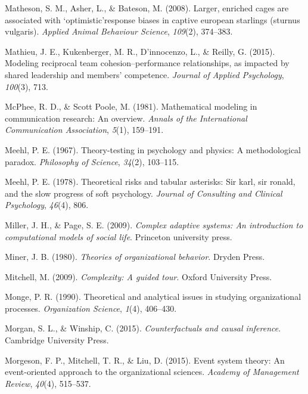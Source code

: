 \documentclass[english,,man]{apa6}
\theoremstyle{definition}
\theoremstyle{definition}
\theoremstyle{definition}
\theoremstyle{remark}
\begin{document}
\leavevmode\hypertarget{ref-matheson2008}{}%
Matheson, S. M., Asher, L., \& Bateson, M. (2008). Larger, enriched
cages are associated with `optimistic'response biases in captive
european starlings (sturnus vulgaris). \emph{Applied Animal Behaviour
Science}, \emph{109}(2), 374--383.

\leavevmode\hypertarget{ref-mathieu2015}{}%
Mathieu, J. E., Kukenberger, M. R., D'innocenzo, L., \& Reilly, G.
(2015). Modeling reciprocal team cohesion--performance relationships, as
impacted by shared leadership and members' competence. \emph{Journal of
Applied Psychology}, \emph{100}(3), 713.

\leavevmode\hypertarget{ref-mcphee1981}{}%
McPhee, R. D., \& Scott Poole, M. (1981). Mathematical modeling in
communication research: An overview. \emph{Annals of the International
Communication Association}, \emph{5}(1), 159--191.

\leavevmode\hypertarget{ref-meehl1967}{}%
Meehl, P. E. (1967). Theory-testing in psychology and physics: A
methodological paradox. \emph{Philosophy of Science}, \emph{34}(2),
103--115.

\leavevmode\hypertarget{ref-meehl1978}{}%
Meehl, P. E. (1978). Theoretical risks and tabular asterisks: Sir karl,
sir ronald, and the slow progress of soft psychology. \emph{Journal of
Consulting and Clinical Psychology}, \emph{46}(4), 806.

\leavevmode\hypertarget{ref-miller2009}{}%
Miller, J. H., \& Page, S. E. (2009). \emph{Complex adaptive systems: An
introduction to computational models of social life}. Princeton
university press.

\leavevmode\hypertarget{ref-miner1980}{}%
Miner, J. B. (1980). \emph{Theories of organizational behavior}. Dryden
Press.

\leavevmode\hypertarget{ref-mitchell2009}{}%
Mitchell, M. (2009). \emph{Complexity: A guided tour}. Oxford University
Press.

\leavevmode\hypertarget{ref-monge1990}{}%
Monge, P. R. (1990). Theoretical and analytical issues in studying
organizational processes. \emph{Organization Science}, \emph{1}(4),
406--430.

\leavevmode\hypertarget{ref-morgan2015}{}%
Morgan, S. L., \& Winship, C. (2015). \emph{Counterfactuals and causal
inference}. Cambridge University Press.

\leavevmode\hypertarget{ref-morgeson2015}{}%
Morgeson, F. P., Mitchell, T. R., \& Liu, D. (2015). Event system
theory: An event-oriented approach to the organizational sciences.
\emph{Academy of Management Review}, \emph{40}(4), 515--537.
\end{document}
